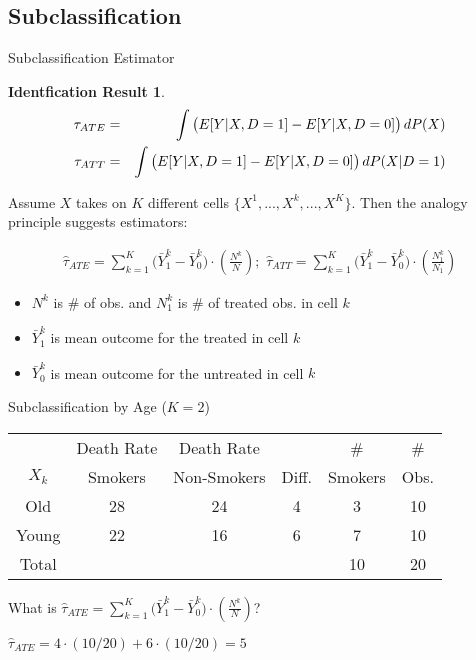 \documentclass{beamer}
\numberwithin{equation}{section}
\newtheorem{ires}{Identfication Result}
\begin{document}
\subsection{Subclassification}\label{subclassification-1}

\begin{frame}{Subclassification Estimator}

\begin{ires}
\begin{eqnarray}\small
\tau_{ATE}&=& \int \big(E[Y|X,D=1]-E[Y|X,D=0]\big)\,dP(X) \nonumber\\
\tau_{ATT}&=&\int \big(E[Y|X,D=1]-E[Y|X,D=0]\big)\,dP(X|D=1) \nonumber
\end{eqnarray}
\end{ires}

Assume $X$ takes on $K$ different cells $\{X^1,..., X^k,...,X^K\}$. Then
the analogy principle suggests estimators: \pause

\begin{eqnarray*}
\widehat{\tau}_{ATE}= \sum_{k=1}^K \big(
\bar{Y}_1^k - \bar{Y}_0^k
\big)\cdot
\left(
\frac{N^k}{N}
\right);\,\,
\widehat{\tau}_{ATT}= \sum_{k=1}^K \big(
\bar{Y}_1^k - \bar{Y}_0^k
\big)\cdot
\left(
\frac{N_1^k}{N_1}
\right)
\end{eqnarray*}

\begin{itemize}
\itemsep1pt\parskip0pt
\item
  $N^k$ is \# of obs. and $N_1^k$ is \# of treated obs. in cell $k$
\item
  $\bar{Y}_1^k$ is mean outcome for the treated in cell $k$
\item
  $\bar{Y}_0^k$ is mean outcome for the untreated in cell $k$
\end{itemize}

\end{frame}

\begin{frame}{Subclassification by Age ($K = 2$)}

\begin{tabular}{c|c|c|c|c|c}
           & Death Rate & Death Rate &            &          \# &         \#  \\
       $X_k$ &    Smokers & Non-Smokers &      Diff. &    Smokers &       Obs. \\
       \hline
       Old &         28 &         24 &         4 &          3 &         10 \\
       \hline
     Young &         22 &         16 &         6 &          7 &         10 \\
     \hline
     Total &            &            &            &         10 &         20 \\
\end{tabular}

What is
$\widehat{\tau}_{ATE}= \sum_{k=1}^K \big( \bar{Y}_1^k - \bar{Y}_0^k \big)\cdot \left( \frac{N^k}{N} \right)$?
\pause

$\widehat{\tau}_{ATE}=4\cdot(10/20)+6\cdot(10/20)=5$

\end{frame}
\end{document}
